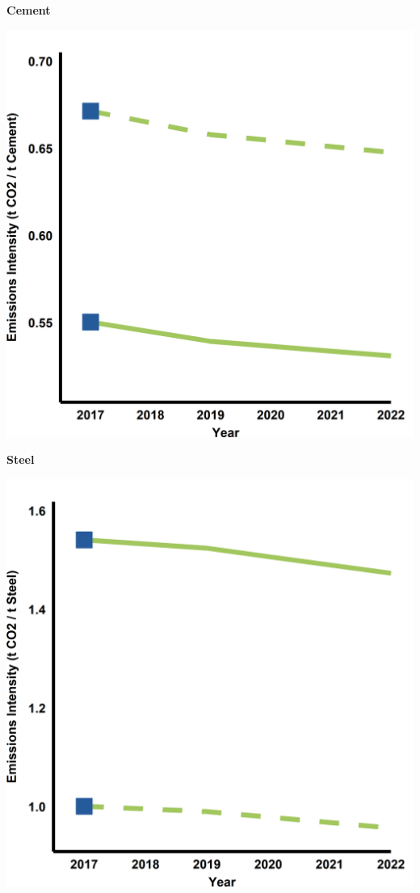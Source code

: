 \documentclass[10pt,table,a4]{article}\usepackage[]{graphicx}\usepackage[]{color}
\begin{document}
			\begin{multicols}{2}
					
				\textbf{Cement}
				
				\includegraphics[width=.9\linewidth]{Figures/Fig41}
			
			
				\textbf{Steel}
					
				\includegraphics[width=.9\linewidth]{Figures/Fig42}
			
			\end{multicols}
	
\end{document}
